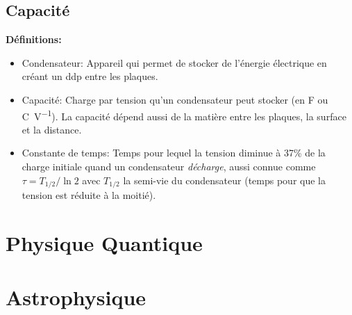 \documentclass[french, a4paper, 12pt]{article}
\begin{document}
\subsection{Capacité}
\textbf{Définitions:}
\begin{itemize}
\item Condensateur: Appareil qui permet de stocker de l'énergie électrique en créant un ddp entre les plaques.
\item Capacité: Charge par tension qu'un condensateur peut stocker (en \si{\farad} ou \si{\coulomb\per\volt}). La capacité dépend aussi de la matière entre les plaques, la surface et la distance.
\item Constante de temps: Temps pour lequel la tension diminue à 37\% de la charge initiale quand un condensateur \emph{décharge}, aussi connue comme $\tau = T_{1/2}/\ln 2$ avec $T_{1/2}$ la \og semi-vie \fg{} du condensateur (temps pour que la tension est réduite à la moitié).
\end{itemize}
\pagebreak

\section{Physique Quantique}
\pagebreak

\section{Astrophysique}
\end{document}
